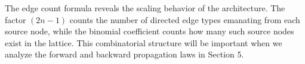 The edge count formula reveals the scaling behavior of the architecture. The factor $(2n-1)$ counts the number of directed edge types emanating from each source node, while the binomial coefficient counts how many such source nodes exist in the lattice. This combinatorial structure will be important when we analyze the forward and backward propagation laws in Section 5.
